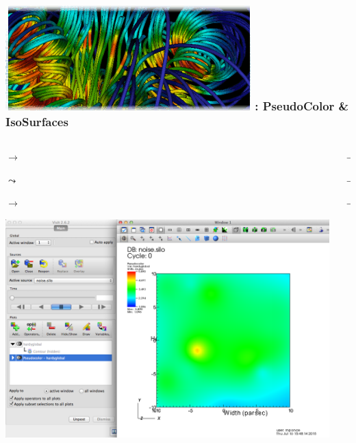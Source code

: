 \begin{frame}
\frametitle{\href{https://wci.llnl.gov/simulation/computer-codes/visit/}{\includegraphics[height=.85cm]{figs/visit-logos/VisIt-01}} \hspace{-.85cm}{\bf \textcolor{lightgray}{VisIt}}: PseudoColor \& IsoSurfaces}
\vspace{-1.85mm}
\begin{columns}
\begin{column}{6cm}
        \textcolor{DarkBlue}{}
         $\rightarrow$ \framebox{\textcolor{DarkRed}{\bf Pseudocolor}}

        \hspace{5.5mm}
        $\leadsto$ \framebox{\textcolor{DarkGreen}{\it hardyglobal}}

        \hspace{5.5mm}
        $\rightarrow$ \framebox{\textcolor{DarkBlue}{Draw}}

        \centering
        \includegraphics[width=\columnwidth]{figs/visit-pract/VisIt_pseudocolor}
\end{column}
\begin{column}{6cm}
        \pause
        \textcolor{DarkBlue}{}
                $\rightarrow$ 

        \hspace{5.5mm}
        $\rightarrow$ \framebox{\textcolor{DarkRed}{\bf Isosurface}}

        \hspace{5.5mm}
        $\rightarrow$ \framebox{\textcolor{DarkBlue}{Draw}}


\end{column}
\end{columns}
\end{frame}
